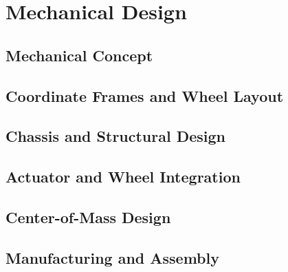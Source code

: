 \chapter{Mechanical Design}

\section{Mechanical Concept}

\section{Coordinate Frames and Wheel Layout}

\section{Chassis and Structural Design}

\section{Actuator and Wheel Integration}

\section{Center-of-Mass Design}

\section{Manufacturing and Assembly}
